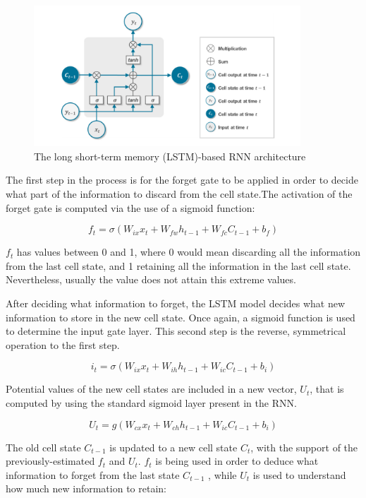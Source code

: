 \documentclass[10pt,twocolumn,letterpaper]{article}
\begin{document}
\begin{figure}[h]
\begin{center}
    
   \includegraphics[width=10cm]{final-report-latex/LSTM.png}
   \caption{The long short-term memory (LSTM)-based RNN architecture}
   \end{center}
\end{figure}

The first step in the process is for the forget gate to be applied in order to decide what part of the information to discard from the cell state.The activation of the forget gate is computed via the use of a sigmoid function:

$$f_t=\sigma(W_{ix}x_t+ W_{fw}h_{t-1}+W_{fc}C_{t-1}+b_f) $$

 $f_t$ has values between 0 and 1, where 0 would mean discarding all the information from the last cell state, and 1 retaining all the information in the last cell state. Nevertheless, usually the value does not attain this extreme values.
 
After deciding what information to forget, the LSTM model decides what new information to store in the new cell state. Once again, a sigmoid function is used to determine the input gate layer. This second step is the reverse, symmetrical operation to the first step.

$$i_t=\sigma(W_{ix}x_t+W_{ih}h_{t-1}+W_{ic}C_{t-1}+b_i)$$

Potential values of the new cell states are included in a new vector, $U_t$, that is computed by using the standard sigmoid layer present in the RNN.

$$U_t=g(W_{cx}x_t+W_{ch}h_{t-1}+W_{ic}C_{t-1}+b_i) $$

The old cell state $C_{t−1}$ is updated to a new cell state $C_t$, with the support of the previously-estimated $f_t$ and $U_t$. $f_t$ is being used in order to deduce what  information to forget from the last state $C_{t−1}$ , while $U_t$ is used to understand how much new information to retain:
\end{document}
